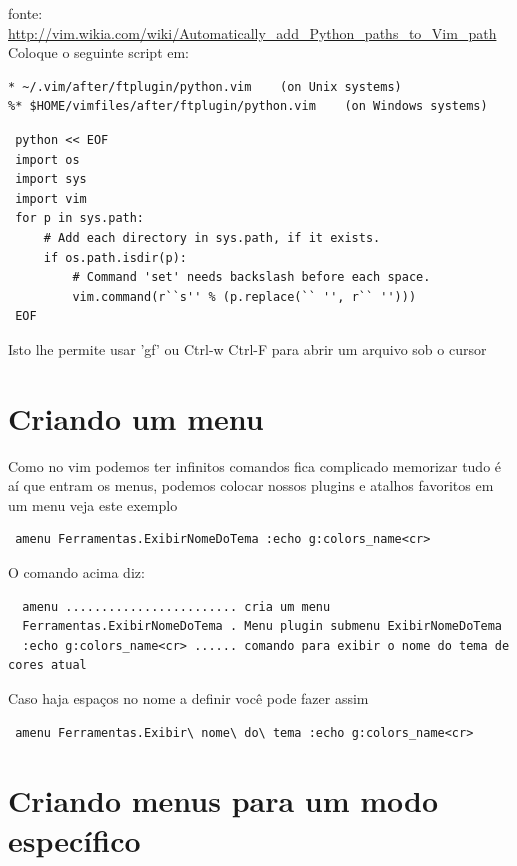 \documentclass[10pt,a4paper,openany]{book}
\begin{document}
fonte:
\url{http://vim.wikia.com/wiki/Automatically_add_Python_paths_to_Vim_path}
Coloque o seguinte script em:

\begin{verbatim}
* ~/.vim/after/ftplugin/python.vim    (on Unix systems)
%* $HOME/vimfiles/after/ftplugin/python.vim    (on Windows systems)
\end{verbatim}

\begin{verbatim}
 python << EOF
 import os
 import sys
 import vim
 for p in sys.path:
     # Add each directory in sys.path, if it exists.
     if os.path.isdir(p):
         # Command 'set' needs backslash before each space.
         vim.command(r``s'' % (p.replace(`` '', r`` '')))
 EOF
\end{verbatim}

Isto lhe permite usar 'gf' ou Ctrl-w Ctrl-F para abrir um arquivo sob o cursor

\section{Criando um menu}
\label{Criando um menu}

Como no vim podemos ter infinitos comandos fica complicado memorizar tudo
é aí que entram os menus, podemos colocar nossos plugins e atalhos favoritos
em um menu veja este exemplo

\begin{verbatim}
 amenu Ferramentas.ExibirNomeDoTema :echo g:colors_name<cr>
\end{verbatim}

O comando acima diz:

\begin{verbatim}
  amenu ........................ cria um menu
  Ferramentas.ExibirNomeDoTema . Menu plugin submenu ExibirNomeDoTema
  :echo g:colors_name<cr> ...... comando para exibir o nome do tema de cores atual
\end{verbatim}

Caso haja espaços no nome a definir você pode fazer assim

\begin{verbatim}
 amenu Ferramentas.Exibir\ nome\ do\ tema :echo g:colors_name<cr>
\end{verbatim}

\section{Criando menus para um modo específico}
\label{Criando menus para um modo específico}
\end{document}
